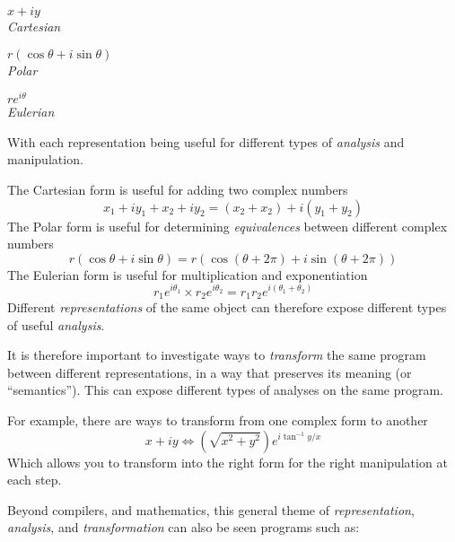\begin{minipage}[t]{0.33\textwidth}
    \begin{center}
        $x + iy$\\
        \small\textit{Cartesian}
    \end{center}
\end{minipage}%
\begin{minipage}[t]{0.33\textwidth}
    \begin{center}
        $r(\cos \theta + i \sin\theta)$\\
        \small\textit{Polar}
    \end{center}
\end{minipage}%
\begin{minipage}[t]{0.33\textwidth}
    \begin{center}
        $re^{i \theta}$\\
        \small\textit{Eulerian}
    \end{center}
\end{minipage}

With each representation being useful for different types of \textit{analysis} and manipulation. 

The Cartesian form is useful for adding two complex numbers
\[x_1 + iy_1 + x_2 + iy_2 = (x_2 + x_2) + i(y_1 + y_2)\]
The Polar form is useful for determining \textit{equivalences} between different complex numbers
\[r(\cos \theta + i \sin \theta) = r(\cos (\theta + 2\pi) + i \sin (\theta + 2\pi) )\]
The Eulerian form is useful for multiplication and exponentiation
\[r_1e^{i\theta_1} \times r_2e^{i\theta_2} = r_1r_2e^{i(\theta_1 + \theta_2)}\]
Different \textit{representations} of the same object can therefore expose different types of useful \emph{analysis}. 

It is therefore important to investigate ways to \emph{transform} the same program between different representations, in a way that preserves its meaning (or ``semantics''). This can expose different types of analyses on the same program.  

For example, there are ways to transform from one complex form to another
\[x + iy \iff (\sqrt{x^2 + y^2})e^{i\tan^{-1}{y/x}}\]
Which allows you to transform into the right form for the right manipulation at each step. 

Beyond compilers, and mathematics, this general theme of \textit{representation}, \textit{analysis}, and \textit{transformation} can also be seen programs such as:

